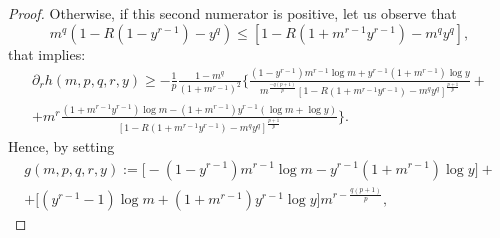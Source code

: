 \documentclass{amsart}
\theoremstyle{definition}
\theoremstyle{remark}
\newcommand{\de}{\partial}
\begin{document}
\begin{proof}
Otherwise, if this second numerator is positive, let us observe that
\begin{equation*}
m^q(1-R(1- y^{r-1}) - y^q)\leq [1-R(1+m^{r-1}y^{r-1})-m^{q}y^{q}],
\end{equation*}
that implies:
\begin{multline}\label{derivata_hge}
\de_{r}h(m,p,q,r,y) \ge -\frac1p\frac{1-m^{q}}{(1+m^{r-1})^{2}}\bigg\{\frac{ (1-y^{r-1})m^{r-1}\log m +y^{r-1}(1+m^{r-1})\log y}{m^{\frac {-q(p+1)}p}  \left[1-R(1+m^{r-1}y^{r-1})-m^{q}y^{q}\right]^\frac {p+1} p }+ \\[.3cm]
+m^r \frac{(1+m^{r-1}y^{r-1})\log m-(1+m^{r-1})y^{r-1}(\log m +\log y)}{ \left[1-R(1+m^{r-1}y^{r-1})-m^{q}y^{q}\right]^\frac {p+1} p}\bigg\}.
\end{multline}
Hence, by setting
\begin{multline*}
g(m,p,q,r,y):=\bigg[ -(1-y^{r-1})m^{r-1}\log m -y^{r-1}(1+m^{r-1})\log y\bigg]+\\
+ \bigg[(y^{r-1}-1)\log m+(1+m^{r-1})y^{r-1}\log y\bigg]m^{r-\frac{q(p+1)}p},

\end{multline*}
\end{proof}
\end{document}

